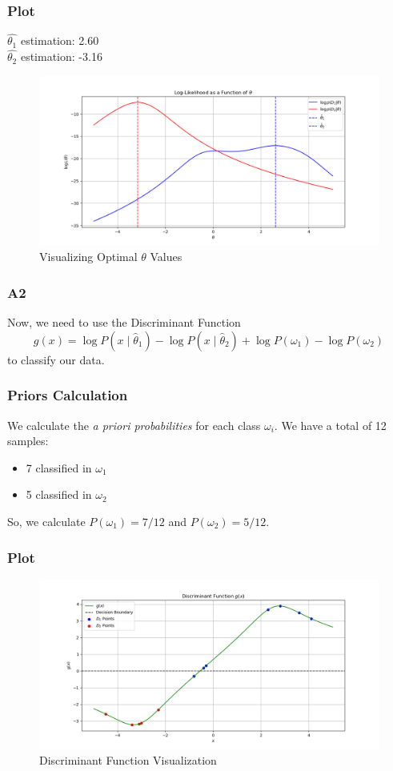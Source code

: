 \documentclass{beamer}
\begin{document}
\begin{frame}
\frametitle{Plot}
$\hat{\theta_1}$ estimation:  2.60\\
$\hat{\theta_2}$ estimation: -3.16
\begin{figure}
    \centering
    \includegraphics[width=1\linewidth]{assets/A1.png}
    \caption{Visualizing Optimal $\theta$ Values}
    \label{fig:enter-label}
\end{figure}
\end{frame}

\begin{frame}
\frametitle{A2}
Now, we need to use the Discriminant Function $$ g(x) = \log P(x \mid \hat{\theta}_1) - \log P(x \mid \hat{\theta}_2) + \log P(\omega_1) - \log P(\omega_2) $$ to classify our data.
\end{frame}

\begin{frame}
\frametitle{Priors Calculation}
We calculate the \textit{a priori probabilities} for each class $\omega_i$. We have a total of 12 samples:
\begin{itemize}
    \item 7 classified in $\omega_1$
    \item 5 classified in $\omega_2$
\end{itemize}
\vspace{0.5cm}
So, we calculate $P(\omega_1)=7/12$ and $P(\omega_2)=5/12$.
\end{frame}

\begin{frame}
\frametitle{Plot}
\begin{figure}
    \centering
    \includegraphics[width=1\linewidth]{assets/A2.png}
    \caption{Discriminant Function Visualization}
    \label{fig:enter-label}
\end{figure}
\end{frame}
\end{document}
